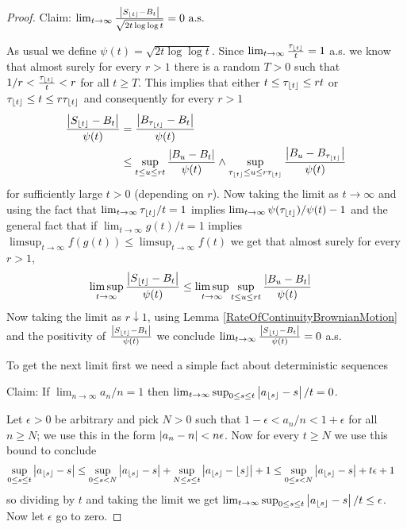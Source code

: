 \begin{proof}
Claim: $\lim_{t \to \infty} \frac{\left \vert S_{\left \lfloor t \right \rfloor} - B_t \right \vert}{\sqrt{2t\log \log t}} = 0 \text { a.s.}$

As usual we define $\psi(t) = \sqrt{2t\log \log t}$.  Since $\lim_{t
  \to \infty} \frac{\tau_{\left \lfloor t \right \rfloor}}{t} = 1$ a.s. we know that almost
surely for every $r > 1$ there is a random $T > 0$ such that $1/r <
\frac{\tau_{\left \lfloor t \right \rfloor}}{t} < r$ for all $t \geq T$.  This implies that
either $t \leq \tau_{\left \lfloor t \right \rfloor} \leq rt$ or $\tau_{\left \lfloor t \right \rfloor} \leq t
\leq r \tau_{\left \lfloor t \right \rfloor}$ and consequently for every $r > 1$
\begin{align*}
\frac{\left \vert S_{\left \lfloor t \right \rfloor} - B_t \right \vert}{\psi(t)} &=
\frac{\left \vert B_{\tau_{\left \lfloor t \right \rfloor}} - B_t \right \vert}{\psi(t)} \\
&\leq \sup_{t \leq u \leq rt} \frac{\left \vert B_u - B_t \right \vert}{\psi(t)} \wedge 
\sup_{\tau_{\left \lfloor t \right \rfloor} \leq u \leq r \tau_{\left \lfloor t \right \rfloor}} \frac{\left \vert B_u - B_{\tau_{\left \lfloor t \right \rfloor}} \right \vert}{\psi(t)} 
\end{align*}
for sufficiently large $t > 0$ (depending on $r$).  Now taking the
limit as $t \to \infty$ and using the fact that $\lim_{t \to \infty}
\tau_{\left \lfloor t \right \rfloor}/t =1$ implies $\lim_{t \to \infty}
\psi(\tau_{\left \lfloor t \right \rfloor})/\psi(t) -1 $ and the general fact that if $\lim_{t
  \to \infty} g(t)/t = 1$ implies  $\limsup_{t \to \infty} f(g(t))
\leq \limsup_{t \to \infty} f(t)$ we get that almost surely for every
$r > 1$,
\begin{align*}
\limsup_{t \to \infty} \frac{\left \vert S_{\left \lfloor t \right \rfloor} - B_t \right \vert}{\psi(t)} &\leq
\limsup_{t \to \infty} \sup_{t \leq u \leq rt} \frac{\left \vert B_u - B_t \right \vert}{\psi(t)}
\end{align*}
Now taking the limit as $r \downarrow 1$, using Lemma
\ref{RateOfContinuityBrownianMotion} and the positivity of
$\frac{\left \vert S_{\left \lfloor t \right \rfloor} - B_t \right \vert}{\psi(t)}$ we conclude $\lim_{t \to
  \infty}  \frac{\left \vert S_{\left \lfloor t \right \rfloor} - B_t \right \vert}{\psi(t)} = 0$ a.s.

To get the next limit first we need a simple fact about deterministic
sequences

Claim: If $\lim_{n \to \infty} a_n/n = 1$ then $\lim_{t \to \infty}
\sup_{0 \leq s \leq t} \left \vert a_{\left \lfloor s \right \rfloor} - s \right \vert/t = 0$.

Let $\epsilon > 0$ be arbitrary and pick $N > 0$ such that $1-\epsilon
< a_n/n < 1 + \epsilon$ for all $n \geq N$; we use this in the form
$\left \vert a_n -n \right \vert < n\epsilon$.  Now for every $t \geq N$ we use this
bound to conclude
\begin{align*}
\sup_{0 \leq s \leq t} \left \vert a_{\left \lfloor s \right \rfloor} - s \right \vert &\leq 
\sup_{0 \leq s  < N} \left \vert a_{\left \lfloor s \right \rfloor} - s \right \vert + 
\sup_{N \leq s \leq t} \left \vert a_{\left \lfloor s \right \rfloor} - \left \lfloor s \right \rfloor \right \vert + 1 
\leq 
\sup_{0 \leq s  < N} \left \vert a_{\left \lfloor s \right \rfloor} - s \right \vert + 
t \epsilon + 1 
\end{align*}
so dividing by $t$ and taking the limit we get 
$\lim_{t \to \infty} \sup_{0 \leq s \leq t} \left \vert a_{\left \lfloor s \right \rfloor} - s \right \vert/t
\leq \epsilon$.  Now let $\epsilon$ go to zero.


\end{proof}
